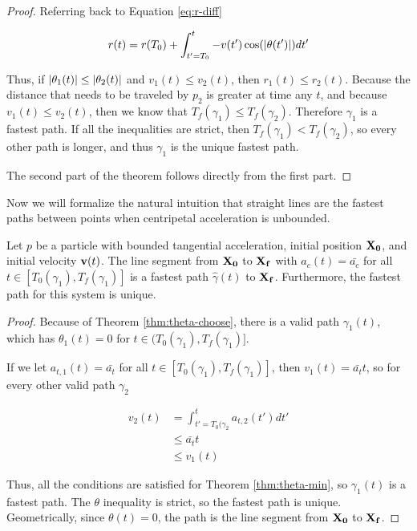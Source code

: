 \begin{proof}
  Referring back to Equation \ref{eq:r-diff}

  \[r(t) = r(T_0) + \int_{t' = T_0}^{t} - v(t') \cos(\abs{\theta(t')}) dt'\]

  Thus, if $\abs{\theta_1(t)} \le \abs{\theta_2(t)}$ and $v_1(t) \le v_2(t)$, then $r_1(t) \le r_2(t)$. Because the distance that needs to be traveled by $p_2$ is greater at time any $t$, and because $v_1(t) \le v_2(t)$, then we know that $T_f(\gamma_1) \le T_f(\gamma_2)$. Therefore $\gamma_1$ is a fastest path. If all the inequalities are strict, then $T_f(\gamma_1) < T_f(\gamma_2)$, so every other path is longer, and thus $\gamma_1$ is the unique fastest path.

  The second part of the theorem follows directly from the first part.
\end{proof}

Now we will formalize the natural intuition that straight lines are the fastest paths between points when centripetal acceleration is unbounded.

\begin{theorem}\label{thm:line-proof}
  Let $p$ be a particle with bounded tangential acceleration, initial position $\mathbf{X_0}$, and initial velocity $\mathbf{v}(t)$. The line segment from $\mathbf{X_0}$ to $\mathbf{X_f}$ with $a_c(t) = \bar{a_c}$ for all $t \in [T_0(\gamma_1), T_f(\gamma_1)]$ is a fastest path $\hat{\gamma}(t)$ to $\mathbf{X_f}$. Furthermore, the fastest path for this system is unique.
\end{theorem}

\begin{proof}
  Because of Theorem \ref{thm:theta-choose}, there is a valid path $\gamma_1(t)$, which has $\theta_1(t) = 0$ for $t \in (T_0(\gamma_1), T_f(\gamma_1)]$.

  If we let $a_{t, 1}(t) = \bar{a_t}$ for all $t \in [T_0(\gamma_1), T_f(\gamma_1)]$, then $v_1(t) = \bar{a_t} t$, so for every other valid path $\gamma_2$

  \begin{align*}
    v_2(t)& = \int_{t'=T_0(\gamma_2}^{t} a_{t, 2}(t') dt'\\
    & \le \bar{a_t} t\\
    &  \le v_1(t)
  \end{align*}

  Thus, all the conditions are satisfied for Theorem \ref{thm:theta-min}, so $\gamma_1(t)$ is a fastest path. The $\theta$ inequality is strict, so the fastest path is unique. Geometrically, since $\theta(t) = 0$, the path is the line segment from $\mathbf{X_0}$ to $\mathbf{X_f}$.
\end{proof}

